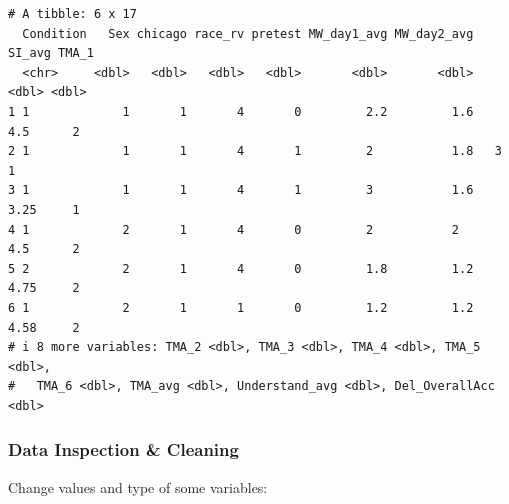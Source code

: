 \documentclass[
  letterpaper,
  DIV=11,
  numbers=noendperiod]{scrartcl}
\newenvironment{Shaded}{\begin{snugshade}}{\end{snugshade}}
\newcommand{\CommentTok}[1]{\textcolor[rgb]{0.38,0.63,0.69}{\textit{#1}}}
\newcommand{\DecValTok}[1]{\textcolor[rgb]{0.25,0.63,0.44}{#1}}
\newcommand{\FunctionTok}[1]{\textcolor[rgb]{0.02,0.16,0.49}{#1}}
\newcommand{\NormalTok}[1]{\textcolor[rgb]{0.00,0.44,0.13}{#1}}
\newcommand{\OtherTok}[1]{\textcolor[rgb]{0.00,0.44,0.13}{#1}}
\newcommand{\SpecialCharTok}[1]{\textcolor[rgb]{0.25,0.44,0.63}{#1}}
\begin{document}
\begin{verbatim}
# A tibble: 6 x 17
  Condition   Sex chicago race_rv pretest MW_day1_avg MW_day2_avg SI_avg TMA_1
  <chr>     <dbl>   <dbl>   <dbl>   <dbl>       <dbl>       <dbl>  <dbl> <dbl>
1 1             1       1       4       0         2.2         1.6   4.5      2
2 1             1       1       4       1         2           1.8   3        1
3 1             1       1       4       1         3           1.6   3.25     1
4 1             2       1       4       0         2           2     4.5      2
5 2             2       1       4       0         1.8         1.2   4.75     2
6 1             2       1       1       0         1.2         1.2   4.58     2
# i 8 more variables: TMA_2 <dbl>, TMA_3 <dbl>, TMA_4 <dbl>, TMA_5 <dbl>,
#   TMA_6 <dbl>, TMA_avg <dbl>, Understand_avg <dbl>, Del_OverallAcc <dbl>
\end{verbatim}

\hypertarget{data-inspection-cleaning}{%
\subsubsection{Data Inspection \&
Cleaning}\label{data-inspection-cleaning}}

Change values and type of some variables:

\begin{Shaded}
\end{Shaded}
\end{document}

